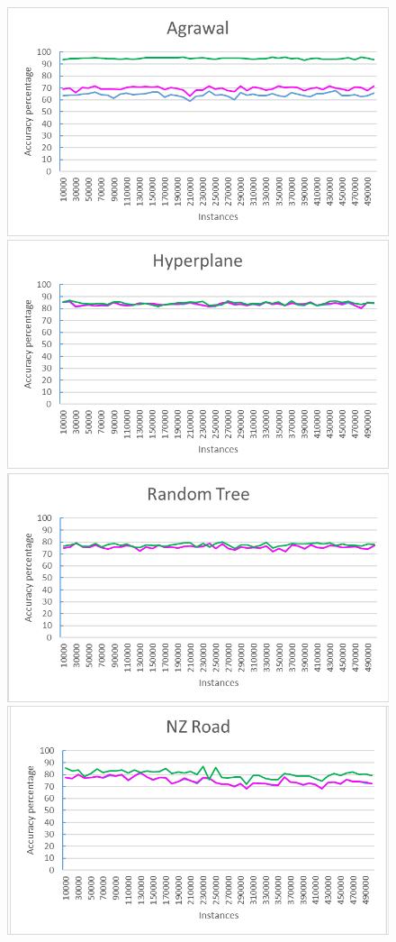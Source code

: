 \begin{figure}[h]
\includegraphics[scale=0.17]{Graphs/Agrawal/vsDFW}
\includegraphics[scale=0.17]{Graphs/Hyperplane/vsDFW}
\includegraphics[scale=0.17]{Graphs/TreeD10/vsDFW}
\includegraphics[scale=0.17]{Graphs/NZRoad/vsDFW}

\end{figure}
